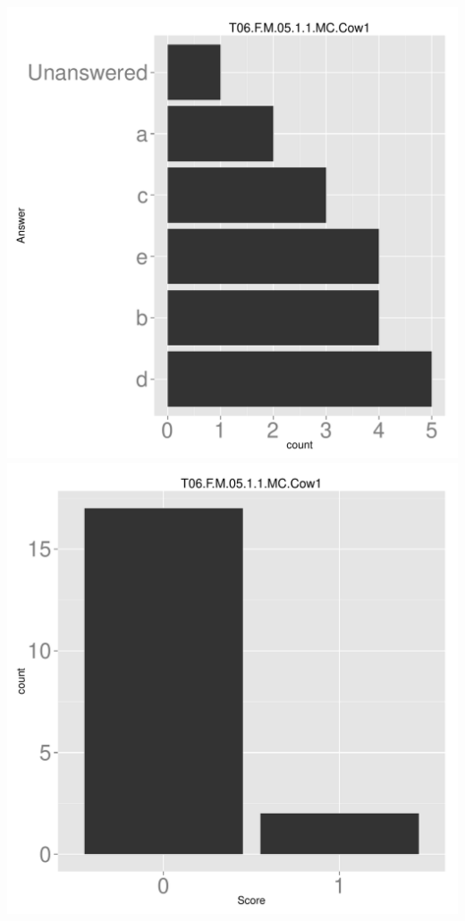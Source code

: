 \documentclass[12pt,nohyper]{tufte-handout}\usepackage[]{graphicx}\usepackage[]{color}
\begin{document}
\begin{center} \includegraphics[width=.45\linewidth]{Topic06_49_answer} \includegraphics[width=.45\linewidth]{Topic06_49_score} \end{center} 
\end{document}
